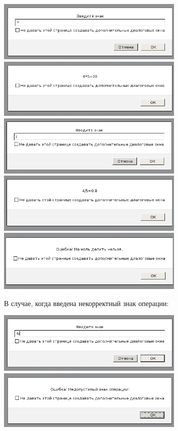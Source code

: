 \begin{center}
  \includegraphics[width=9cm]{img/0207.png}
  \includegraphics[width=9cm]{img/0208.png}
  \includegraphics[width=9cm]{img/0209.png}
  \includegraphics[width=9cm]{img/0210.png}
  \includegraphics[width=9cm]{img/0211.png}
\end{center}

В случае, когда введена некорректный знак операции:

\begin{center}
  \includegraphics[width=9cm]{img/08.png}
  \includegraphics[width=9cm]{img/09.png}
\end{center}

